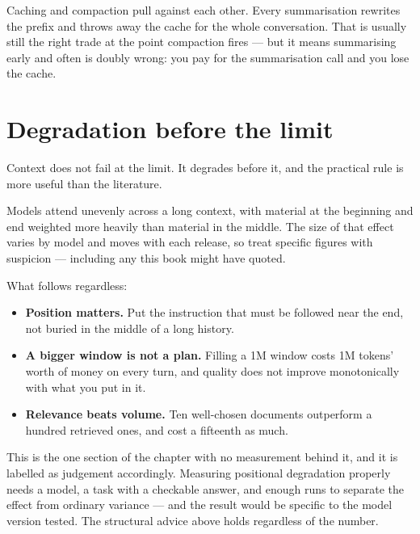 \begin{warning}
Caching and compaction pull against each other. Every summarisation rewrites the
prefix and throws away the cache for the whole conversation. That is usually
still the right trade at the point compaction fires --- but it means summarising
early and often is doubly wrong: you pay for the summarisation call and you lose
the cache.
\end{warning}

\section{Degradation before the limit}
\label{sec:degradation}

Context does not fail at the limit. It degrades before it, and the practical rule
is more useful than the literature.

Models attend unevenly across a long context, with material at the beginning and
end weighted more heavily than material in the middle. The size of that effect
varies by model and moves with each release, so treat specific figures with
suspicion --- including any this book might have quoted.

What follows regardless:

\begin{itemize}[leftmargin=1.4em,nosep]
\item \textbf{Position matters.} Put the instruction that must be followed near
      the end, not buried in the middle of a long history.
\item \textbf{A bigger window is not a plan.} Filling a 1M window costs 1M
      tokens' worth of money on every turn, and quality does not improve
      monotonically with what you put in it.
\item \textbf{Relevance beats volume.} Ten well-chosen documents outperform a
      hundred retrieved ones, and cost a fifteenth as much.
\end{itemize}

\begin{note}
This is the one section of the chapter with no measurement behind it, and it is
labelled as judgement accordingly. Measuring positional degradation properly
needs a model, a task with a checkable answer, and enough runs to separate the
effect from ordinary variance --- and the result would be specific to the model
version tested. The structural advice above holds regardless of the number.
\end{note}

